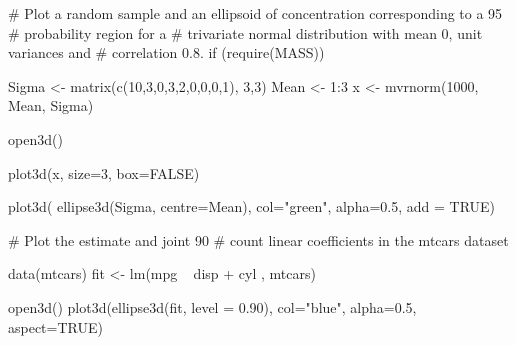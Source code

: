 \begin{Examples}
\begin{ExampleCode}
# Plot a random sample and an ellipsoid of concentration corresponding to a 95%
# probability region for a
# trivariate normal distribution with mean 0, unit variances and 
# correlation 0.8.
if (require(MASS)) {
  Sigma <- matrix(c(10,3,0,3,2,0,0,0,1), 3,3)
  Mean <- 1:3
  x <- mvrnorm(1000, Mean, Sigma)
  
  open3d()
  
  plot3d(x, size=3, box=FALSE)
  
  plot3d( ellipse3d(Sigma, centre=Mean), col="green", alpha=0.5, add = TRUE)
}  

# Plot the estimate and joint 90%
# count linear coefficients in the mtcars dataset

data(mtcars)
fit <- lm(mpg ~ disp + cyl , mtcars)

open3d()
plot3d(ellipse3d(fit, level = 0.90), col="blue", alpha=0.5, aspect=TRUE)
\end{ExampleCode}
\end{Examples}

